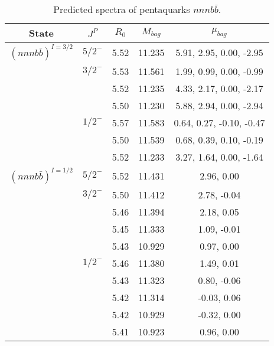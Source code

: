 \documentclass[prd,twocolumn,floatfix,nofootinbib]{revtex4}
\begin{document}
\renewcommand{\tabcolsep}{0.5cm}
\renewcommand{\arraystretch}{1.2}
\begin{table*}[!htbp]
    \caption{Predicted spectra of pentaquarks $nnnb\bar{b}$.}
    \begin{tabular}{ccccc}
        \hline\hline
        {\rm State} &$J^{P}$ &$R_{0}$ &$M_{bag}$ &$\mu_{bag}$ \\ \hline
        ${(nnnb\bar{b})}^{I=3/2}$
            &${5/2}^{-}$    &5.52   &11.235  &5.91, 2.95, 0.00, -2.95  \\
            &${3/2}^{-}$    &5.53   &11.561 & 1.99, 0.99, 0.00, -0.99 \\
            &               &5.52   &11.235  &4.33, 2.17, 0.00, -2.17\\
            &               &5.50   &11.230  &5.88, 2.94, 0.00, -2.94  \\

            &${1/2}^{-}$    &5.57   &11.583  &0.64, 0.27, -0.10, -0.47\\
            &               &5.50   &11.539  &0.68, 0.39, 0.10, -0.19 \\
            &               &5.52   &11.233  &3.27, 1.64, 0.00, -1.64 \\
        ${(nnnb\bar{b})}^{I=1/2}$
            &${5/2}^{-}$    &5.52   &11.431  &2.96, 0.00 \\
            &${3/2}^{-}$    &5.50   &11.412  &2.78, -0.04 \\
            &               &5.46   &11.394  &2.18, 0.05 \\
            &               &5.45   &11.333  &1.09, -0.01 \\
            &               &5.43   &10.929  &0.97, 0.00 \\
            &${1/2}^{-}$    &5.46   &11.380  &1.49, 0.01 \\
            &               &5.43   &11.323  &0.80, -0.06 \\
            &               &5.42   &11.314  &-0.03, 0.06 \\
            &               &5.42   &10.929  &-0.32, 0.00 \\
            &               &5.41   &10.923  &0.96, 0.00 \\
        \hline\hline
    \end{tabular}
\end{table*}
\end{document}
